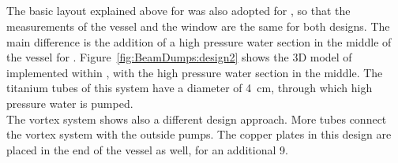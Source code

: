 \subsection{\designtwo}
\label{BeamDumps:design:design2}
The basic layout explained above for \designone was also adopted for \designtwo, so that the measurements of the vessel and the window are the same for both designs.
The main difference is the addition of a high pressure water section in the middle of the vessel  for \designtwo.
Figure~\ref{fig:BeamDumps:design2} shows the 3D model of \designtwo implemented within \flair, with the high pressure water section in the middle. 
The titanium tubes of this system have a diameter of \SI{4}{\centi\meter}, through which high pressure water is pumped.
\\The vortex system shows also a different design approach.
More tubes connect the vortex system with the outside pumps.
The copper plates in this design are placed in the end of the vessel as well, for an additional \SI{9}{\xzero}.

